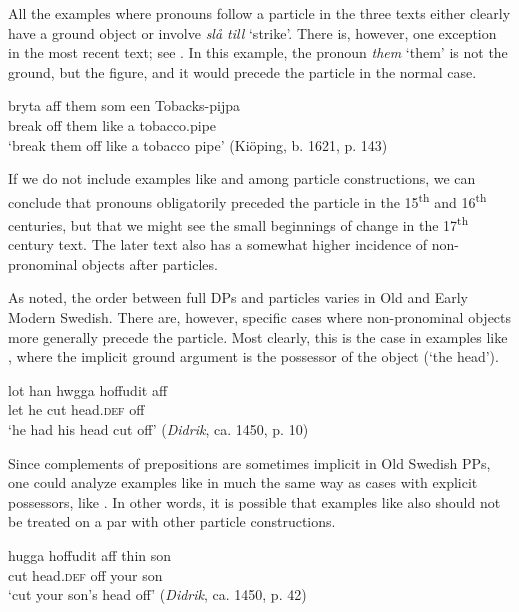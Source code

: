 \documentclass[output=paper]{langscibook}
\begin{document}
All the examples where pronouns follow a particle in the three texts either clearly have a ground object or involve \textit{slå till} ‘strike’. There is, however, one exception in the most recent text; see . In this example, the pronoun \textit{them} ‘them’ is not the ground, but the figure, and it would precede the particle in the normal case.


\ea\label{ex:lalu:29}
\gll  bryta     aff   them   som   een     Tobacks-pijpa\\
break   off   them   like     a     tobacco.pipe\\
\glt `break them off like a tobacco pipe’ (Kiöping, b. 1621, p. 143)\\
\z


If we do not include examples like  and  among particle constructions, we can conclude that pronouns obligatorily preceded the particle in the 15\textsuperscript{th} and 16\textsuperscript{th} centuries, but that we might see the small beginnings of change in the 17\textsuperscript{th} century text. The later text also has a somewhat higher incidence of non-pronominal objects after particles.



As noted, the order between full DPs and particles varies in Old and Early Modern Swedish. There are, however, specific cases where non-pronominal objects more generally precede the particle. Most clearly, this is the case in examples like , where the implicit ground argument is the possessor of the object (‘the head’).


\ea\label{ex:lalu:30}
\gll  lot    han   hwgga   hoffudit aff\\
let    he   cut     head.\textsc{def}   off \\
\glt `he had his head cut off’ (\textit{Didrik}, ca. 1450, p. 10)\\
\z


Since complements of prepositions are sometimes implicit in Old Swedish PPs, one could analyze examples like  in much the same way as cases with explicit possessors, like . In other words, it is possible that examples like  also should not be treated on a par with other particle constructions.


\ea\label{ex:lalu:31}
\gll  hugga   hoffudit       aff     thin     son\\
cut         head.\textsc{def}   off   your   son\\
\glt `cut your son’s head off’ (\textit{Didrik}, ca. 1450, p. 42)\\
\z
\end{document}
